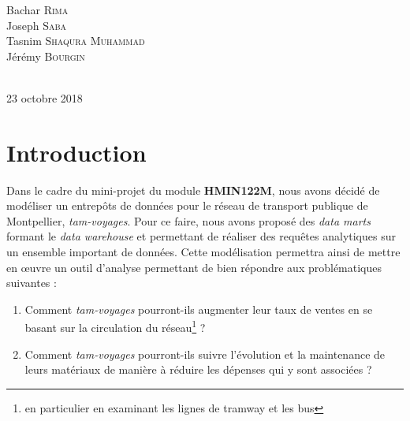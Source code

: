 \documentclass[a4paper,12pt]{report}
\begin{document}
\begin{titlepage}
\begin{minipage}{\textwidth}
\centering \huge
Bachar \textsc{Rima}\\ %
Joseph \textsc{Saba}\\ %
Tasnim \textsc{Shaqura Muhammad}\\ %
Jérémy \textsc{Bourgin} %
\end{minipage} \\[0.8cm]

{\large 23 octobre 2018}\\[1cm]
\hspace{\fill}
\vfill %
\end{titlepage}

\pagestyle{plain}

{
  \hypersetup{linkcolor=black}
  \tableofcontents
}

\newpage

\chapter*{Introduction}
\label{chap:intro}
Dans le cadre du mini-projet du module \textbf{HMIN122M}, nous avons décidé de modéliser un entrepôts de données pour le réseau de transport publique de Montpellier, \textit{tam-voyages}. Pour ce faire, nous avons proposé des \textit{data marts} formant le \textit{data warehouse} et permettant de réaliser des requêtes analytiques sur un ensemble important de données. Cette modélisation permettra ainsi de mettre en \oe{}uvre un outil d'analyse permettant de bien répondre aux problématiques suivantes :
\begin{enumerate}
  \item Comment \textit{tam-voyages} pourront-ils augmenter leur taux de ventes en se basant sur la circulation du réseau\footnote{en particulier en examinant les lignes de tramway et les bus} ?
  \item Comment \textit{tam-voyages} pourront-ils suivre l'évolution et la maintenance de leurs matériaux de manière à réduire les dépenses qui y sont associées ?
\end{enumerate}
\end{document}

